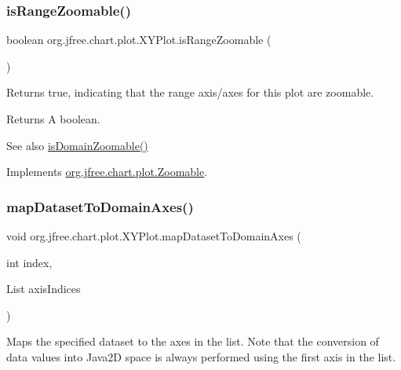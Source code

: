 \subsubsection{\texorpdfstring{is\+Range\+Zoomable()}{isRangeZoomable()}}
{\footnotesize\ttfamily boolean org.\+jfree.\+chart.\+plot.\+X\+Y\+Plot.\+is\+Range\+Zoomable (\begin{DoxyParamCaption}{ }\end{DoxyParamCaption})}

Returns {\ttfamily true}, indicating that the range axis/axes for this plot are zoomable.

\begin{DoxyReturn}{Returns}
A boolean.
\end{DoxyReturn}
\begin{DoxySeeAlso}{See also}
\mbox{\hyperlink{classorg_1_1jfree_1_1chart_1_1plot_1_1_x_y_plot_a5f49e32b31451203cae07ffee7cab4db}{is\+Domain\+Zoomable()}} 
\end{DoxySeeAlso}


Implements \mbox{\hyperlink{interfaceorg_1_1jfree_1_1chart_1_1plot_1_1_zoomable_aee592b4d6f620a0571974e29247a66b1}{org.\+jfree.\+chart.\+plot.\+Zoomable}}.

\mbox{\label{classorg_1_1jfree_1_1chart_1_1plot_1_1_x_y_plot_a5ecd05c9688ef985aa6ce9727e6fe98a}} 
\subsubsection{\texorpdfstring{map\+Dataset\+To\+Domain\+Axes()}{mapDatasetToDomainAxes()}}
{\footnotesize\ttfamily void org.\+jfree.\+chart.\+plot.\+X\+Y\+Plot.\+map\+Dataset\+To\+Domain\+Axes (\begin{DoxyParamCaption}\item[{int}]{index,  }\item[{List}]{axis\+Indices }\end{DoxyParamCaption})}

Maps the specified dataset to the axes in the list. Note that the conversion of data values into Java2D space is always performed using the first axis in the list.


